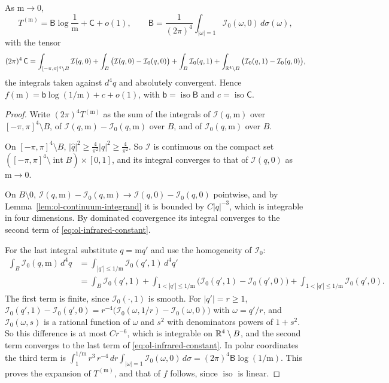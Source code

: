 \begin{lemma}\label{lem:ol-infrared}
As $\mathrm m\to0$,
\[
T^{(\mathrm m)}=\mathsf B\log\frac1{\mathrm m}+\mathsf C+o(1),\qquad\mathsf B=\frac1{(2\pi)^4}\int_{|\omega|=1}\mathcal I_0(\omega,0)\,d\sigma(\omega),
\]
with the tensor
\begin{equation}\label{eq:ol-infrared-constant}
(2\pi)^4\,\mathsf C=\int_{[-\pi,\pi]^4\setminus B}\mathcal I(q,0)+\int_B\big(\mathcal I(q,0)-\mathcal I_0(q,0)\big)+\int_B\mathcal I_0(q,1)+\int_{\mathbb R^4\setminus B}\big(\mathcal I_0(q,1)-\mathcal I_0(q,0)\big),
\end{equation}
the integrals taken against $d^4q$ and absolutely convergent. Hence $f(\mathrm m)=\mathsf b\log(1/\mathrm m)+c+o(1)$, with $\mathsf b=\operatorname{iso}\mathsf B$ and $c=\operatorname{iso}\mathsf C$.
\end{lemma}

\begin{proof}
Write $(2\pi)^4T^{(\mathrm m)}$ as the sum of the integrals of $\mathcal I(q,\mathrm m)$ over $[-\pi,\pi]^4\setminus B$, of $\mathcal I(q,\mathrm m)-\mathcal I_0(q,\mathrm m)$ over $B$, and of $\mathcal I_0(q,\mathrm m)$ over $B$.

On $[-\pi,\pi]^4\setminus B$, $|\hat q|^2\ge\frac4{\pi^2}|q|^2\ge\frac4{\pi^2}$. So $\mathcal I$ is continuous on the compact set $([-\pi,\pi]^4\setminus\operatorname{int}B)\times[0,1]$, and its integral converges to that of $\mathcal I(q,0)$ as $\mathrm m\to0$.

On $B\setminus0$, $\mathcal I(q,\mathrm m)-\mathcal I_0(q,\mathrm m)\to\mathcal I(q,0)-\mathcal I_0(q,0)$ pointwise, and by Lemma~\ref{lem:ol-continuum-integrand} it is bounded by $C|q|^{-3}$, which is integrable in four dimensions. By dominated convergence its integral converges to the second term of \eqref{eq:ol-infrared-constant}.

For the last integral substitute $q=\mathrm mq'$ and use the homogeneity of $\mathcal I_0$:
\[
\begin{aligned}
\int_B\mathcal I_0(q,\mathrm m)\,d^4q&=\int_{|q'|\le1/\mathrm m}\mathcal I_0(q',1)\,d^4q'\\
&=\int_B\mathcal I_0(q',1)+\int_{1<|q'|\le1/\mathrm m}\big(\mathcal I_0(q',1)-\mathcal I_0(q',0)\big)+\int_{1<|q'|\le1/\mathrm m}\mathcal I_0(q',0).
\end{aligned}
\]
The first term is finite, since $\mathcal I_0(\cdot,1)$ is smooth. For $|q'|=r\ge1$, $\mathcal I_0(q',1)-\mathcal I_0(q',0)=r^{-4}\big(\mathcal I_0(\omega,1/r)-\mathcal I_0(\omega,0)\big)$ with $\omega=q'/r$, and $\mathcal I_0(\omega,s)$ is a rational function of $\omega$ and $s^2$ with denominators powers of $1+s^2$. So this difference is at most $Cr^{-6}$, which is integrable on $\mathbb R^4\setminus B$, and the second term converges to the last term of \eqref{eq:ol-infrared-constant}. In polar coordinates the third term is $\int_1^{1/\mathrm m}r^3\,r^{-4}\,dr\int_{|\omega|=1}\mathcal I_0(\omega,0)\,d\sigma=(2\pi)^4\mathsf B\log(1/\mathrm m)$. This proves the expansion of $T^{(\mathrm m)}$, and that of $f$ follows, since $\operatorname{iso}$ is linear.
\end{proof}

